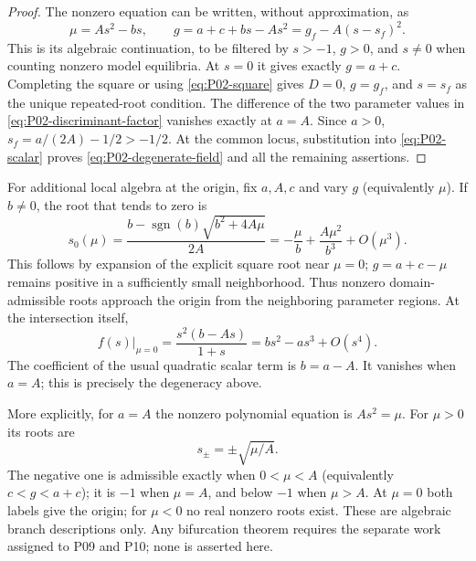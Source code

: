 \begin{proof}
The nonzero equation can be written, without approximation, as
\begin{equation}
\label{eq:P02-branch-graph}
 \mu=As^2-bs,\qquad
 g=a+c+bs-As^2
   =g_f-A(s-s_f)^2.
\end{equation}
This is its algebraic continuation, to be filtered by $s>-1$,
$g>0$, and $s\ne0$ when counting nonzero model equilibria.
At $s=0$ it gives exactly $g=a+c$. Completing the square or using
\eqref{eq:P02-square} gives $D=0$, $g=g_f$, and $s=s_f$ as the
unique repeated-root condition. The difference of the two parameter
values in \eqref{eq:P02-discriminant-factor} vanishes exactly at
$a=A$. Since $a>0$, $s_f=a/(2A)-1/2>-1/2$. At the common
locus, substitution into \eqref{eq:P02-scalar} proves
\eqref{eq:P02-degenerate-field} and all the remaining assertions.
\end{proof}

For additional local algebra at the origin, fix $a,A,c$ and vary $g$
(equivalently $\mu$). If $b\ne0$, the root that tends to zero is
\begin{equation}
\label{eq:P02-local-branch}
 s_0(\mu)=\frac{b-\operatorname{sgn}(b)\sqrt{b^2+4A\mu}}{2A}
        =-\frac{\mu}{b}+\frac{A\mu^2}{b^3}+O(\mu^3).
\end{equation}
This follows by expansion of the explicit square root near $\mu=0$;
$g=a+c-\mu$ remains positive in a sufficiently small neighborhood.
Thus nonzero domain-admissible roots approach the origin from the
neighboring parameter regions. At the intersection itself,
\begin{equation}
\label{eq:P02-quadratic-coefficient}
 f(s)\big|_{\mu=0}=\frac{s^2(b-As)}{1+s}
                     =bs^2-as^3+O(s^4).
\end{equation}
The coefficient of the usual quadratic scalar term is $b=a-A$.
It vanishes when $a=A$; this is precisely the degeneracy above.

More explicitly, for $a=A$ the nonzero polynomial equation is
$As^2=\mu$. For $\mu>0$ its roots are
\begin{equation}
\label{eq:P02-square-root-branches}
 s_\pm=\pm\sqrt{\mu/A}.
\end{equation}
The negative one is admissible exactly when $0<\mu<A$ (equivalently
$c<g<a+c$); it is $-1$ when $\mu=A$, and below $-1$ when $\mu>A$.
At $\mu=0$ both labels give the origin; for $\mu<0$ no real
nonzero roots exist. These are algebraic branch descriptions only.
Any bifurcation theorem requires the separate work assigned to P09
and P10; none is asserted here.

